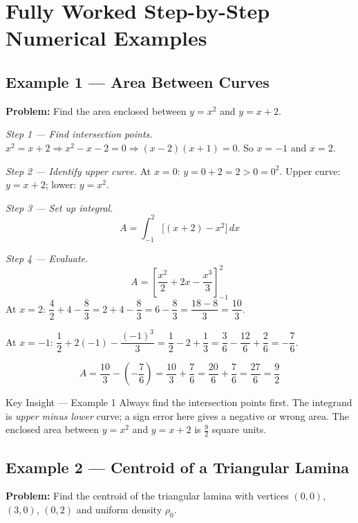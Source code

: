 \documentclass[12pt,a4paper]{article}
\begin{document}
\section{Fully Worked Step-by-Step Numerical Examples}

\subsection*{Example 1 --- Area Between Curves}

\textbf{Problem:} Find the area enclosed between \(y = x^2\) and \(y = x + 2\).

\textit{Step 1 --- Find intersection points.}
\(x^2 = x + 2 \Rightarrow x^2 - x - 2 = 0 \Rightarrow (x-2)(x+1) = 0\). So \(x = -1\) and \(x = 2\).

\textit{Step 2 --- Identify upper curve.}
At \(x = 0\): \(y = 0 + 2 = 2 > 0 = 0^2\). Upper curve: \(y = x + 2\); lower: \(y = x^2\).

\textit{Step 3 --- Set up integral.}
\[
A = \int_{-1}^{2} \bigl[(x+2) - x^2\bigr]\,dx
\]

\textit{Step 4 --- Evaluate.}
\[
A = \left[\frac{x^2}{2} + 2x - \frac{x^3}{3}\right]_{-1}^{2}
\]
At \(x = 2\): \(\dfrac{4}{2} + 4 - \dfrac{8}{3} = 2 + 4 - \dfrac{8}{3} = 6 - \dfrac{8}{3} = \dfrac{18-8}{3} = \dfrac{10}{3}\).

At \(x = -1\): \(\dfrac{1}{2} + 2(-1) - \dfrac{(-1)^3}{3} = \dfrac{1}{2} - 2 + \dfrac{1}{3} = \dfrac{3}{6} - \dfrac{12}{6} + \dfrac{2}{6} = -\dfrac{7}{6}\).

\[
A = \frac{10}{3} - \left(-\frac{7}{6}\right) = \frac{10}{3} + \frac{7}{6} = \frac{20}{6} + \frac{7}{6} = \frac{27}{6} = \frac{9}{2}
\]

\begin{learnbox}{Key Insight --- Example 1}
Always find the intersection points first. The integrand is \emph{upper minus lower} curve; a sign error here gives a negative or wrong area. The enclosed area between \(y = x^2\) and \(y = x+2\) is \(\tfrac{9}{2}\) square units.
\end{learnbox}

\subsection*{Example 2 --- Centroid of a Triangular Lamina}

\textbf{Problem:} Find the centroid of the triangular lamina with vertices \((0,0)\), \((3,0)\), \((0,2)\) and uniform density \(\rho_0\).
\end{document}
